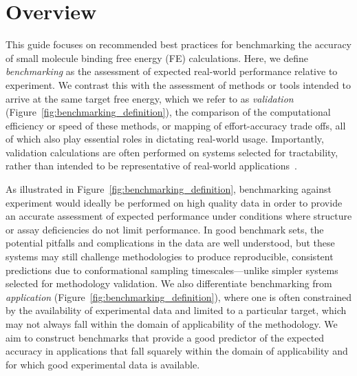 \documentclass[9pt,bestpractices]{livecoms}
\begin{document}

\section{Overview}

This guide focuses on recommended best practices for benchmarking the accuracy of small molecule binding free energy (FE) calculations. 
Here, we define \emph{benchmarking} as the assessment of expected real-world performance relative to experiment.
We contrast this with the assessment of methods or tools intended to arrive at the same target free energy, which we refer to as \emph{validation} (Figure~\ref{fig:benchmarking_definition}), the comparison of the computational efficiency or speed of these methods, or mapping of effort-accuracy trade offs, all of which also play essential roles in dictating real-world usage.
Importantly, validation calculations are often performed on systems selected for tractability, rather than intended to be representative of real-world applications~\cite{mobleyPredictingBindingFree2017,vangunsteren_validation_2018,tsai_validation_2020}. 


%

As illustrated in Figure~\ref{fig:benchmarking_definition}, benchmarking against experiment would ideally be performed on high quality data in order to provide an accurate assessment of expected performance under conditions where structure or assay deficiencies do not limit performance. 
In good benchmark sets, the potential pitfalls and complications in the data are well understood, but these systems may still challenge methodologies to produce reproducible, consistent predictions due to conformational sampling timescales---unlike simpler systems selected for methodology validation.
We also differentiate benchmarking from \emph{application} (Figure~\ref{fig:benchmarking_definition}), where one is often constrained by the availability of experimental data and limited to a particular target, which may not always fall within the domain of applicability of the methodology. 
We aim to construct benchmarks that provide a good predictor of the expected accuracy in applications that fall squarely within the domain of applicability and for which good experimental data is available.
\end{document}
